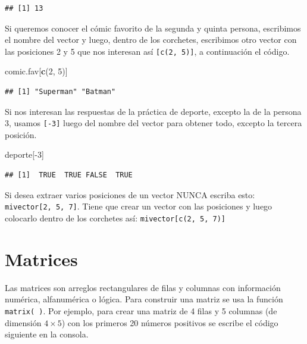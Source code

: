 \documentclass[10pt,]{krantz}
\makeatletter
\newenvironment{Shaded}{\begin{snugshade}}{\end{snugshade}}
\newcommand{\KeywordTok}[1]{\textcolor[rgb]{0.13,0.29,0.53}{\textbf{{#1}}}}
\newcommand{\DecValTok}[1]{\textcolor[rgb]{0.00,0.00,0.81}{{#1}}}
\newcommand{\NormalTok}[1]{{#1}}
\newenvironment{kframe}{%
\medskip{}
\setlength{\fboxsep}{.8em}
 \def\at@end@of@kframe{}%
 \ifinner\ifhmode%
  \def\at@end@of@kframe{\end{minipage}}%
  \begin{minipage}{\columnwidth}%
 \fi\fi%
 \def\FrameCommand##1{\hskip\@totalleftmargin \hskip-\fboxsep
 \colorbox{shadecolor}{##1}\hskip-\fboxsep
     \hskip-\linewidth \hskip-\@totalleftmargin \hskip\columnwidth}%
 \MakeFramed {\advance\hsize-\width
   \@totalleftmargin\z@ \linewidth\hsize
   \@setminipage}}%
 {\par\unskip\endMakeFramed%
 \at@end@of@kframe}
\renewenvironment{Shaded}{\begin{kframe}}{\end{kframe}}
\let\BeginKnitrBlock\begin \let\EndKnitrBlock\end
\makeatother
\begin{document}
\begin{verbatim}
## [1] 13
\end{verbatim}

Si queremos conocer el cómic favorito de la segunda y quinta persona,
escribimos el nombre del vector y luego, dentro de los corchetes,
escribimos otro vector con las posiciones 2 y 5 que nos interesan así
\texttt{{[}c(2,\ 5){]}}, a continuación el código.

\begin{Shaded}
\begin{Highlighting}[]
\NormalTok{comic.fav[}\KeywordTok{c}\NormalTok{(}\DecValTok{2}\NormalTok{, }\DecValTok{5}\NormalTok{)]}
\end{Highlighting}
\end{Shaded}

\begin{verbatim}
## [1] "Superman" "Batman"
\end{verbatim}

Si nos interesan las respuestas de la práctica de deporte, excepto la de
la persona 3, usamos \texttt{{[}-3{]}} luego del nombre del vector para
obtener todo, excepto la tercera posición.

\begin{Shaded}
\begin{Highlighting}[]
\NormalTok{deporte[-}\DecValTok{3}\NormalTok{]}
\end{Highlighting}
\end{Shaded}

\begin{verbatim}
## [1]  TRUE  TRUE FALSE  TRUE
\end{verbatim}

\BeginKnitrBlock{rmdwarning}
Si desea extraer varios posiciones de un vector NUNCA escriba esto:
\texttt{mivector{[}2,\ 5,\ 7{]}}. Tiene que crear un vector con las
posiciones y luego colocarlo dentro de los corchetes así:
\texttt{mivector{[}c(2,\ 5,\ 7){]}}
\EndKnitrBlock{rmdwarning}

\section{Matrices}\label{matrices}

Las matrices  son arreglos rectangulares de filas y
columnas con información numérica, alfanumérica o lógica. Para construir
una matriz se usa la función \texttt{matrix(\ )}. Por ejemplo, para
crear una matriz de 4 filas y 5 columnas (de dimensión \(4 \times 5\))
con los primeros 20 números positivos se escribe el código siguiente en
la consola.
\end{document}
